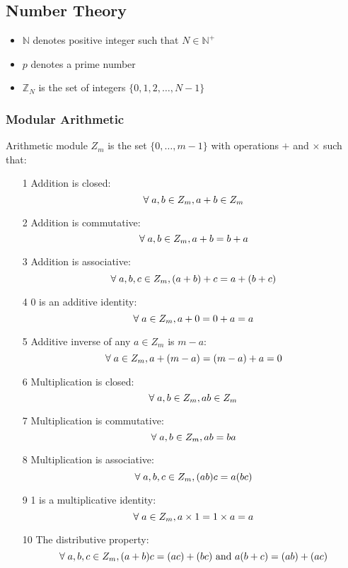 \documentclass[a4paper]{article}
\begin{document}
\subsection{Number Theory}

\begin{itemize}
  \item $\mathbb{N}$ denotes positive integer such that $N \in \mathbb{N}^{+}$
  \item $p$ denotes a prime number
  \item $\mathbb{Z}_{N}$ is the set of integers $\{0, 1, 2, \ldots, N-1\}$
\end{itemize}

\subsubsection{Modular Arithmetic}

Arithmetic module $Z_{m}$ is the set $\{0, \ldots, m-1\}$ with operations
$+$ and $\times$ such that:

\begin{enumerate}
  \item[1] Addition is closed:
           \[\;\forall\; a, b \in Z_{m}, a + b \in Z_{m}\]
  \item[2] Addition is commutative: \\
           \[\;\forall\; a, b \in Z_{m}, a + b = b + a\]
  \item[3] Addition is associative: \\
           \[\;\forall\; a, b, c \in Z_{m}, (a + b) + c = a + (b + c)\]
  \item[4] 0 is an additive identity: \\
           \[\;\forall\; a \in Z_{m}, a + 0 = 0 + a = a\]
  \item[5] Additive inverse of any $a \in Z_{m}$ is $m - a$: \\
           \[\;\forall\; a \in Z_{m}, a + (m - a) = (m - a) + a = 0\]
  \item[6] Multiplication is closed: \\
           \[\;\forall\; a, b \in Z_{m}, ab \in Z_{m}\]
  \item[7] Multiplication is commutative: \\
           \[\;\forall\; a, b \in Z_{m}, ab = ba\]
  \item[8] Multiplication is associative:\\
           \[\;\forall\; a, b, c \in Z_{m}, (ab)c = a(bc)\]
  \item[9] 1 is a multiplicative identity:
           \[\;\forall\; a \in Z_{m}, a \times 1 = 1 \times a = a\]
  \item[10] The distributive property:
           \[\;\forall\; a, b, c \in Z_{m}, (a + b)c = (ac) + (bc) \ \mathrm{and} \ a(b + c) = (ab) + (ac)\]
\end{enumerate}
\end{document}
